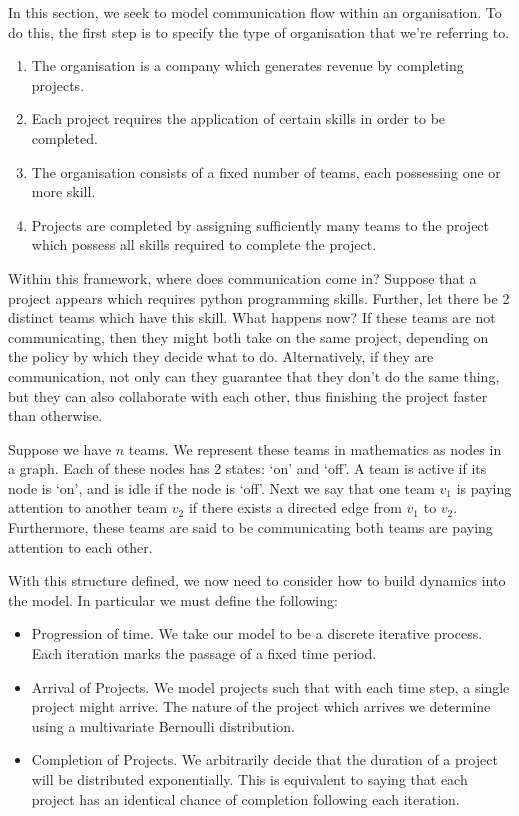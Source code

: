 In this section, we seek to model communication flow within an organisation. To do this, the first step is to specify the type of organisation that we're referring to. 

\begin{enumerate}
	\item The organisation is a company which generates revenue by completing projects.
	
	\item Each project requires the application of certain skills in order to be completed.
	
	\item The organisation consists of a fixed number of teams, each possessing one or more skill.
	
	\item Projects are completed by assigning sufficiently many teams to the project which possess all skills required to complete the project.
\end{enumerate} 

Within this framework, where does communication come in? Suppose that a project appears which requires python programming skills. Further, let there be 2 distinct teams which have this skill. What happens now? If these teams are not communicating, then they might both take on the same project, depending on the policy by which they decide what to do. Alternatively, if they are communication, not only can they guarantee that they don't do the same thing, but they can also collaborate with each other, thus finishing the project faster than otherwise.

Suppose we have $n$ teams. We represent these teams in mathematics as nodes in a graph. Each of these nodes has 2 states: `on' and `off'. A team is active if its node is `on', and is idle if the node is `off'. Next we say that one team $v_1$ is paying attention to another team $v_2$ if there exists a directed edge from $v_1$ to $v_2$. Furthermore, these teams are said to be communicating both teams are paying attention to each other.

With this structure defined, we now need to consider how to build dynamics into the model. In particular we must define the following:

\begin{itemize}
	\item Progression of time. We take our model to be a discrete iterative process. Each iteration marks the passage of a fixed time period. 

	\item Arrival of Projects. We model projects such that with each time step, a single project might arrive. The nature of the project which arrives we determine using a multivariate Bernoulli distribution.
	
	\item Completion of Projects. We arbitrarily decide that the duration of a project will be distributed exponentially. This is equivalent to saying that each project has an identical chance of completion following each iteration.
\end{itemize}


